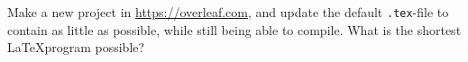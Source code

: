 \label{latex:smallest}
Make a new project in \url{https://overleaf.com}, and update the default \lstinline[language=console]{.tex}-file to contain as little as possible, while still being able to compile. What is the shortest \LaTeX program possible?
